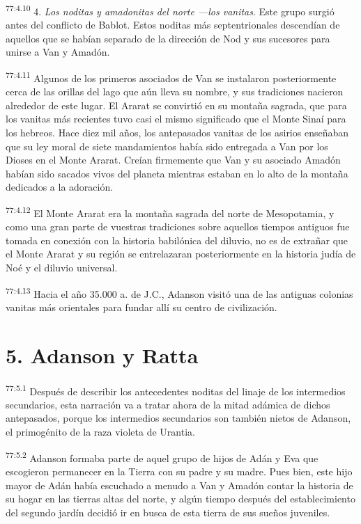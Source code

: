 \par
\textsuperscript{77:4.10} 4. \textit{Los noditas y amadonitas del norte ---los vanitas}. Este grupo surgió antes del conflicto de Bablot. Estos noditas más septentrionales descendían de aquellos que se habían separado de la dirección de Nod y sus sucesores para unirse a Van y Amadón.

\par
\textsuperscript{77:4.11} Algunos de los primeros asociados de Van se instalaron posteriormente cerca de las orillas del lago que aún lleva su nombre, y sus tradiciones nacieron alrededor de este lugar. El Ararat se convirtió en su montaña sagrada, que para los vanitas más recientes tuvo casi el mismo significado que el Monte Sinaí para los hebreos. Hace diez mil años, los antepasados vanitas de los asirios enseñaban que su ley moral de siete mandamientos había sido entregada a Van por los Dioses en el Monte Ararat. Creían firmemente que Van y su asociado Amadón habían sido sacados vivos del planeta mientras estaban en lo alto de la montaña dedicados a la adoración.

\par
\textsuperscript{77:4.12} El Monte Ararat era la montaña sagrada del norte de Mesopotamia, y como una gran parte de vuestras tradiciones sobre aquellos tiempos antiguos fue tomada en conexión con la historia babilónica del diluvio, no es de extrañar que el Monte Ararat y su región se entrelazaran posteriormente en la historia judía de Noé y el diluvio universal.

\par
\textsuperscript{77:4.13} Hacia el año 35.000 a. de J.C., Adanson visitó una de las antiguas colonias vanitas más orientales para fundar allí su centro de civilización.

\section*{5. Adanson y Ratta}
\par
\textsuperscript{77:5.1} Después de describir los antecedentes noditas del linaje de los intermedios secundarios, esta narración va a tratar ahora de la mitad adámica de dichos antepasados, porque los intermedios secundarios son también nietos de Adanson, el primogénito de la raza violeta de Urantia.

\par
\textsuperscript{77:5.2} Adanson formaba parte de aquel grupo de hijos de Adán y Eva que escogieron permanecer en la Tierra con su padre y su madre. Pues bien, este hijo mayor de Adán había escuchado a menudo a Van y Amadón contar la historia de su hogar en las tierras altas del norte, y algún tiempo después del establecimiento del segundo jardín decidió ir en busca de esta tierra de sus sueños juveniles.

